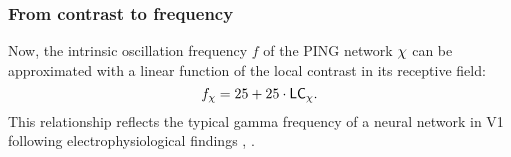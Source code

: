 \subsubsection{From contrast to frequency}

Now, the intrinsic oscillation frequency $f$ of the PING network $\chi$ can be approximated with a linear function of the local contrast in its receptive field:
\begin{equation}
    f_\chi = 25 + 25 \cdot \mathsf{LC}_\chi.
\end{equation}
This relationship reflects the typical gamma frequency of a neural network in V1 following electrophysiological findings \cite{Roberts2013}, \cite{MaryamPLACEHOLDER}.